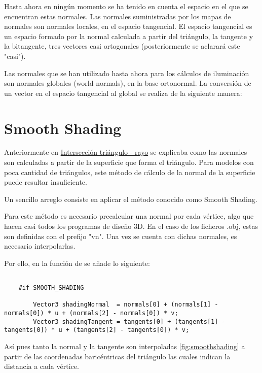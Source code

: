 Hasta ahora en ningún momento se ha tenido en cuenta el espacio en el que se encuentran estas normales. Las normales suministradas por los mapas de normales son normales locales, en el espacio tangencial. El espacio tangencial es un espacio formado por la normal calculada a partir del triángulo, la tangente y la bitangente, tres vectores casi ortogonales (posteriormente se aclarará este "casi").
	
Las normales que se han utilizado hasta ahora para los cálculos de iluminación son normales globales (world normals), en la base ortonormal. La conversión de un vector en el espacio tangencial al global se realiza de la siguiente manera: 
	
	
	
\section{Smooth Shading}
	
Anteriormente en \hyperref[subsec:triintersection]{Intersección triángulo - rayo} se explicaba como las normales son calculadas a partir de la superficie que forma el triángulo. Para modelos con poca cantidad de triángulos, este método de cálculo de la normal de la superficie puede resultar insuficiente.
	
Un sencillo arreglo consiste en aplicar el método conocido como Smooth Shading. 
	
Para este método es necesario precalcular una normal por cada vértice, algo que hacen casi todos los programas de diseño 3D. En el caso de los ficheros .obj, estas son definidas con el prefijo "vn". Una vez se cuenta con dichas normales, es necesario interpolarlas. 

Por ello, en la función  de  se añade lo siguiente:
	
\begin{lstlisting}
			
	#if SMOOTH_SHADING 

        Vector3 shadingNormal  = normals[0] + (normals[1] - normals[0]) * u + (normals[2] - normals[0]) * v;
        Vector3 shadingTangent = tangents[0] + (tangents[1] - tangents[0]) * u + (tangents[2] - tangents[0]) * v;

	\end{lstlisting}
			
Así pues tanto la normal y la tangente son interpoladas \autoref{fig:smoothshading} a partir de las coordenadas baricéntricas del triángulo  las cuales indican la distancia a cada vértice.
	

